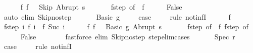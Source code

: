 \begin{isabellebody}
\ \ \ \ \isamarkupfalse%
\ f{\isacharunderscore}{}{\isacharcolon}\ {\isachardoublequoteopen}f\ {}\ {\isacharequal}\ {\isacharparenleft}Skip{\isacharcomma}\ Abrupt\ s{\isacharparenright}{\isachardoublequoteclose}\ \isanewline
\ \ \ \ \isamarkupfalse%
\ f{\isacharunderscore}step\ {\isacharbrackleft}of\ {}{\isacharbrackright}\ f{\isacharunderscore}{}\isanewline
\ \ \ \ \isamarkupfalse%
\ False\isanewline
\ \ \ \ \ \ \isamarkupfalse%
\ {\isacharparenleft}auto\ elim{\isacharcolon}\ Skip{\isacharunderscore}no{\isacharunderscore}step{\isacharparenright}\isanewline
\ \ \isamarkupfalse%
\isanewline
{}\isamarkupfalse%
\isanewline
\ \ \isamarkupfalse%
\ {\isacharparenleft}Basic\ g{\isacharparenright}\ \isanewline
\ \ \isamarkupfalse%
\ {\isacharquery}case\ \isanewline
\ \ \isamarkupfalse%
\ {\isacharparenleft}rule\ not{\isacharunderscore}infI{\isacharparenright}\isanewline
\ \ \ \ \isamarkupfalse%
\ f\isanewline
\ \ \ \ \isamarkupfalse%
\ f{\isacharunderscore}step{\isacharcolon}\ {\isachardoublequoteopen}{\isasymAnd}i{\isachardot}\ {\isasymGamma}{\isasymturnstile}f\ i\ {\isasymrightarrow}\ f\ {\isacharparenleft}Suc\ i{\isacharparenright}{\isachardoublequoteclose}\isanewline
\ \ \ \ \isamarkupfalse%
\ f{\isacharunderscore}{}{\isacharcolon}\ {\isachardoublequoteopen}f\ {}\ {\isacharequal}\ {\isacharparenleft}Basic\ g{\isacharcomma}\ Abrupt\ s{\isacharparenright}{\isachardoublequoteclose}\ \isanewline
\ \ \ \ \isamarkupfalse%
\ f{\isacharunderscore}step\ {\isacharbrackleft}of\ {}{\isacharbrackright}\ f{\isacharunderscore}{}\ f{\isacharunderscore}step\ {\isacharbrackleft}of\ {}{\isacharbrackright}\isanewline
\ \ \ \ \isamarkupfalse%
\ False\isanewline
\ \ \ \ \ \ \isamarkupfalse%
\ {\isacharparenleft}fastforce\ elim{\isacharcolon}\ Skip{\isacharunderscore}no{\isacharunderscore}step\ step{\isacharunderscore}elim{\isacharunderscore}cases{\isacharparenright}\isanewline
\ \ \isamarkupfalse%
\isanewline
{}\isamarkupfalse%
\isanewline
\ \ \isamarkupfalse%
\ {\isacharparenleft}Spec\ r{\isacharparenright}\ \isanewline
\ \ \isamarkupfalse%
\ {\isacharquery}case\ \isanewline
\ \ \isamarkupfalse%
\ {\isacharparenleft}rule\ not{\isacharunderscore}infI{\isacharparenright}\isanewline

\end{isabellebody}
